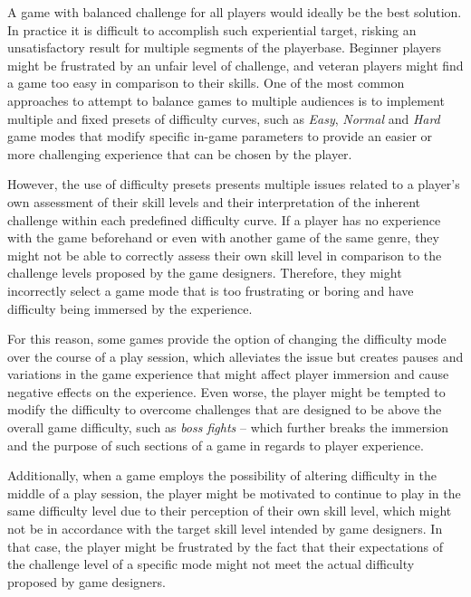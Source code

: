 A game with balanced challenge for all players would ideally be the best solution. In practice it is difficult to accomplish such experiential target, risking an unsatisfactory result for multiple segments of the playerbase. Beginner players might be frustrated by an unfair level of challenge, and veteran players might find a game too easy in comparison to their skills. One of the most common approaches to attempt to balance games to multiple audiences is to implement multiple and fixed presets of difficulty curves, such as \emph{Easy}, \emph{Normal} and \emph{Hard} game modes that modify specific in-game parameters to provide an easier or more challenging experience that can be chosen by the player.

However, the use of difficulty presets presents multiple issues related to a player's own assessment of their skill levels and their interpretation of the inherent challenge within each predefined difficulty curve. If a player has no experience with the game beforehand or even with another game of the same genre, they might not be able to correctly assess their own skill level in comparison to the challenge levels proposed by the game designers. Therefore, they might incorrectly select a game mode that is too frustrating or boring and have difficulty being immersed by the experience.

For this reason, some games provide the option of changing the difficulty mode over the course of a play session, which alleviates the issue but creates pauses and variations in the game experience that might affect player immersion and cause negative effects on the experience. Even worse, the player might be tempted to modify the difficulty to overcome challenges that are designed to be above the overall game difficulty, such as \emph{boss fights} -- which further breaks the immersion and the purpose of such sections of a game in regards to player experience.

Additionally, when a game employs the possibility of altering difficulty in the middle of a play session, the player might be motivated to continue to play in the same difficulty level due to their perception of their own skill level, which might not be in accordance with the target skill level intended by game designers. In that case, the player might be frustrated by the fact that their expectations of the challenge level of a specific mode might not meet the actual difficulty proposed by game designers.

